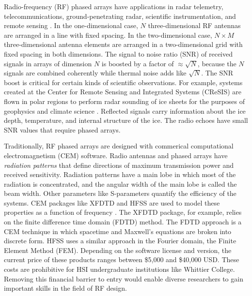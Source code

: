 \documentclass[../../main.tex]{subfiles}
\begin{document}
Radio-frequency (RF) phased arrays have applications in radar telemetry, telecommunications, ground-penetrating radar, scientific instrumentation, and remote sensing \cite{Vieregg_2016,AVVA201746,arnold_2020,PhysRevD.105.122006,10.3390/s21186091,10.1016/j.jappgeo.2022.104876,phased_array_book}.  In the one-dimensional case, $N$ three-dimensional RF antennas are arranged in a line with fixed spacing.  In the two-dimensional case, $N \times M$ three-dimensional antenna elements are arranged in a two-dimensional grid with fixed spacing in both dimensions.  The signal to noise ratio (SNR) of received signals in arrays of dimension $N$ is boosted by a factor of $\approx \sqrt{N}$, because the $N$ signals are combined coherently while thermal noise adds like $\sqrt{N}$.  The SNR boost is critical for certain kinds of scientific observations.  For example, systems created at the Center for Remote Sensing and Integrated Systems (CReSIS) are flown in polar regions to perform radar sounding of ice sheets for the purposes of geophysics and climate science \cite{arnold_2020}.  Reflected signals carry information about the ice depth, temperature, and internal structure of the ice.  The radio echoes have small SNR values that require phased arrays.  \\ \vspace{2.5mm}

Traditionally, RF phased arrays are designed with commerical computational electromagnetism (CEM) software.  Radio antennas and phased arrays have \textit{radiation patterns} that define directions of maximum transmission power and received sensitivity.  Radiation patterns have a main lobe in which most of the radiation is concentrated, and the angular width of the main lobe is called the beam width.  Other parameters like S-parameters quantify the efficiency of the systems.  CEM packages like XFDTD and HFSS are used to model these properties as a function of frequency \cite{remcom,ansys}.  The XFDTD package, for example, relies on the finite difference time domain (FDTD) method. The FDTD approach is a CEM technique in which spacetime and Maxwell’s equations are broken into discrete form.  HFSS uses a similar approach in the Fourier domain, the Finite Element Method (FEM).  Depending on the software license and version, the current price of these products ranges between \$5,000 and \$40,000 USD.  These costs are prohibitive for HSI undergraduate institutions like Whittier College.  Removing this financial barrier to entry would enable diverse researchers to gain important skills in the field of RF design. \\ \vspace{2.5mm}
\end{document}
